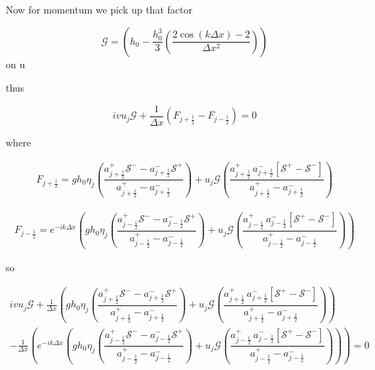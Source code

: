 \documentclass[12pt]{article}
\begin{document}
Now for momentum we pick up that factor

\[\mathcal{G} = \left( h_0 -  \frac{h_0^3}{3} \left(\dfrac{2\cos\left(k{\Delta x}\right) - 2}{\Delta x^2}\right) \right)\]
 on u
 
 thus


\[iv u_j\mathcal{G} + \frac{1}{\Delta x} \left( F_{j+\frac{1}{2}} - F_{j-\frac{1}{2}} \right)  = 0\]

where

\begin{gather}
F_{j+\frac{1}{2}} = gh_0\eta_j \left(\dfrac{a^+_{j+\frac{1}{2}} \mathcal{S^-} - a^-_{j+\frac{1}{2}} \mathcal{S^+} }{a^+_{j+\frac{1}{2}} - a^-_{j+\frac{1}{2}}}\right)   + u_j\mathcal{G} \left(\dfrac{a^+_{j+\frac{1}{2}} \, a^-_{j+\frac{1}{2}}\left [ \mathcal{S^+} -\mathcal{S^-} \right ] }{a^+_{j+\frac{1}{2}} - a^-_{j+\frac{1}{2}}}\right) 
\end{gather}

\begin{gather}
F_{j-\frac{1}{2}} = e^{-ik\Delta x}\left(gh_0\eta_j \left(\dfrac{a^+_{j-\frac{1}{2}} \mathcal{S^-} - a^-_{j-\frac{1}{2}} \mathcal{S^+} }{a^+_{j-\frac{1}{2}} - a^-_{j-\frac{1}{2}}}\right)   + u_{j} \mathcal{G} \left(\dfrac{a^+_{j-\frac{1}{2}} \, a^-_{j-\frac{1}{2}}\left [ \mathcal{S^+} -\mathcal{S^-} \right ] }{a^+_{j-\frac{1}{2}} - a^-_{j-\frac{1}{2}}}\right)\right) 
\end{gather}

so

\begin{multline}
iv u_j\mathcal{G} + \frac{1}{\Delta x}\left(gh_0\eta_j \left(\dfrac{a^+_{j+\frac{1}{2}} \mathcal{S^-} - a^-_{j+\frac{1}{2}} \mathcal{S^+} }{a^+_{j+\frac{1}{2}} - a^-_{j+\frac{1}{2}}}\right)   + u_j\mathcal{G} \left(\dfrac{a^+_{j+\frac{1}{2}} \, a^-_{j+\frac{1}{2}}\left [ \mathcal{S^+} -\mathcal{S^-} \right ] }{a^+_{j+\frac{1}{2}} - a^-_{j+\frac{1}{2}}}\right) \right)  \\
- \frac{1}{\Delta x}\left(e^{-ik\Delta x}\left(gh_0\eta_j \left(\dfrac{a^+_{j-\frac{1}{2}} \mathcal{S^-} - a^-_{j-\frac{1}{2}} \mathcal{S^+} }{a^+_{j-\frac{1}{2}} - a^-_{j-\frac{1}{2}}}\right)   + u_{j} \mathcal{G} \left(\dfrac{a^+_{j-\frac{1}{2}} \, a^-_{j-\frac{1}{2}}\left [ \mathcal{S^+} -\mathcal{S^-} \right ] }{a^+_{j-\frac{1}{2}} - a^-_{j-\frac{1}{2}}}\right)\right)  \right)  = 0
\end{multline}
\end{document}
